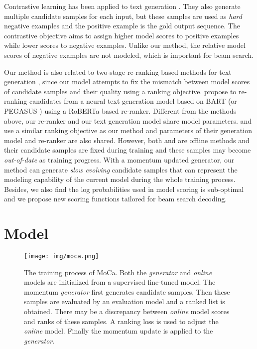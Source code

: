 \documentclass{article}
\begin{document}
Contrastive learning has been applied to text generation \cite{pan-etal-2021-contrastive,cao-wang-2021-cliff,xu2022sequence,cho-etal-2021-contrastive}. They also generate multiple candidate samples for each input, but these samples are used as \emph{hard} negative examples and the positive example is the gold output sequence. The contrastive objective aims to assign higher model scores to positive examples while lower scores to negative examples. Unlike our method, the relative model scores of negative examples are not modeled, which is important for beam search.

Our method is also related to two-stage re-ranking based methods for text generation \cite{shen-etal-2004-discriminative,och-etal-2004-smorgasbord,wan2015multi,mizumoto-matsumoto-2016-discriminative,lee-etal-2021-discriminative,liu-liu-2021-simcls}, since our model attempts to fix the mismatch between model scores of candidate samples and their quality using a ranking objective. \cite{liu-liu-2021-simcls} propose to re-ranking candidates from a neural text generation model based on BART \cite{lewis-etal-2020-bart} (or PEGASUS \cite{zhang:2019:icml}) using a RoBERTa \cite{liu2019roberta} based re-ranker. Different from the methods above, our re-ranker and our text generation model share model parameters.  \cite{liu-etal-2022-brio} and \cite{zhao2022calibrating} use a similar ranking objective as our method and parameters of their generation model and re-ranker are also shared. However, both \cite{liu-etal-2022-brio} and \cite{zhao2022calibrating} are offline methods and their candidate samples are fixed during training and these samples may become \emph{out-of-date} as training progress. With a momentum updated generator, our method can generate \emph{slow evolving} candidate samples that can represent the modeling capability of the current model during the whole training process. Besides, we also find the log probabilities used in model scoring is sub-optimal and we propose new scoring functions tailored for beam search decoding.

\section{Model}
\label{sec:model}



\begin{figure}
    \centering
    \texttt{[image: img/moca.png]}
    \caption{The training process of MoCa. Both the \emph{generator} and \emph{online} models are initialized from a supervised fine-tuned model. The momentum \emph{generator} first generates candidate samples. Then these samples are evaluated by an evaluation model and a ranked list is obtained. There may be a discrepancy between \emph{online} model scores and ranks of these samples. A ranking loss is used to adjust the \emph{online} model. Finally the momentum update is applied to the \emph{generator}.}
    \label{fig:moca}
\end{figure}
\end{document}
